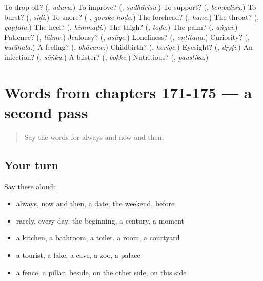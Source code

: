 \begin{tcolorbox}[breakable,colback=teal!4,colframe=teal!35!black,title={Before you move on}]
To drop off? (\textbf{}, \emph{uduru}.) To improve? (\textbf{}, \emph{sudhārisu}.) To support? (\textbf{}, \emph{bembalisu}.) To burst? (\textbf{}, \emph{siḍi}.) To snore? (\textbf{ }, \emph{gorake hoḍe}.) The forehead? (\textbf{}, \emph{haṇe}.) The throat? (\textbf{}, \emph{gaṇṭalu}.) The heel? (\textbf{}, \emph{himmaḍi}.) The thigh? (\textbf{}, \emph{toḍe}.) The palm? (\textbf{}, \emph{aṅgai}.) Patience? (\textbf{}, \emph{tāḷme}.) Jealousy? (\textbf{}, \emph{asūye}.) Loneliness? (\textbf{}, \emph{oṇṭitana}.) Curiosity? (\textbf{}, \emph{kutūhala}.) A feeling? (\textbf{}, \emph{bhāvane}.) Childbirth? (\textbf{}, \emph{herige}.) Eyesight? (\textbf{}, \emph{dṛṣṭi}.) An infection? (\textbf{}, \emph{sōṅku}.) A blister? (\textbf{}, \emph{bokke}.) Nutritious? (\textbf{}, \emph{pauṣṭika}.)
\end{tcolorbox}
\section[(dialogue)]{Words from chapters 171-175 — a second pass}

\label{lesson:KA-R175-second-pass-words-from-chapters-171-175}



\begin{quote}
Say the words for always and now and then.
\end{quote}

\subsection*{Your turn}
Say these aloud:

\begin{itemize}
\raggedright
  \item always, now and then, a date, the weekend, before
  \item rarely, every day, the beginning, a century, a moment
  \item a kitchen, a bathroom, a toilet, a room, a courtyard
  \item a tourist, a lake, a cave, a zoo, a palace
  \item a fence, a pillar, beside, on the other side, on this side
\end{itemize}

